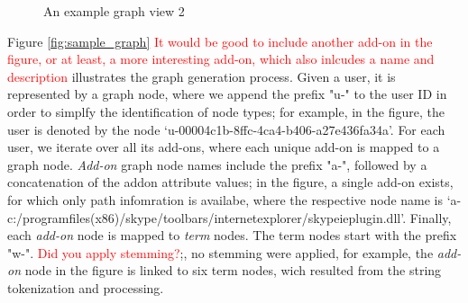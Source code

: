 \documentclass[11pt,oneside]{book}
\begin{document}
  \begin{figure}
    \centering 
    \caption{An example graph view 2}
    \label{fig:sample_graph2}
  \end{figure}
  
Figure \ref{fig:sample_graph} \textcolor{red}{It would be good to include another add-on in the figure, or at least, a more interesting add-on, which also inlcudes a name and description} illustrates the graph generation process. Given a user, it is represented by a graph node, where we append the prefix "u-" to the user ID in order to simplfy the identification of node types; for example, in the figure, the user is denoted by the node `u-00004c1b-8ffc-4ca4-b406-a27e436fa34a'. For each user, we iterate over all its add-ons, where each unique add-on is mapped to a graph node. {\it Add-on} graph node names include the prefix "a-", followed by a concatenation of the addon attribute values; in the figure, a single add-on exists, for which only path infomration is availabe, where the respective node name is `a-c:/programfiles(x86)/skype/toolbars/internetexplorer/skypeieplugin.dll'. Finally, each {\it add-on} node is mapped to {\it term} nodes. The term nodes start with the prefix "w-". \textcolor{red}{Did you apply stemming?};, no stemming were applied, for example, the {\it add-on} node in the figure is linked to six term nodes, wich resulted from the string tokenization and processing. 
  
\end{document}
